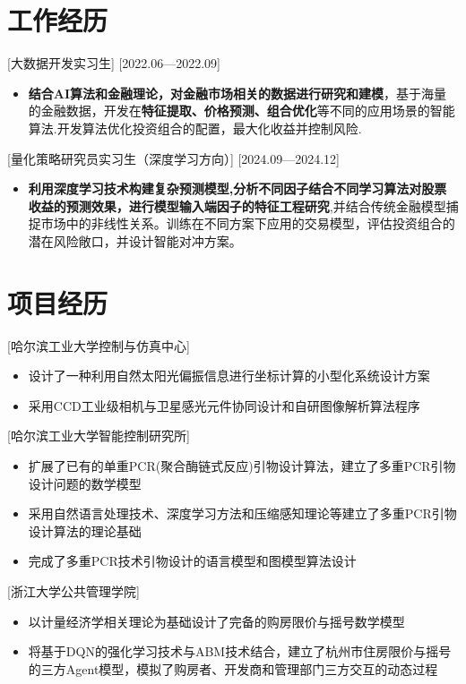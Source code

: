 \documentclass{resume}
\begin{document}
\section{\textbf{工作经历}}

[大数据开发实习生]
[2022.06—2022.09] 

\begin{itemize}
  \item \textbf{结合AI算法和金融理论，对金融市场相关的数据进行研究和建模}，基于海量的金融数据，开发在\textbf{特征提取、价格预测、组合优化}等不同的应用场景的智能算法.开发算法优化投资组合的配置，最大化收益并控制风险.
\end{itemize}
[量化策略研究员实习生（深度学习方向）]
[2024.09—2024.12] 

\begin{itemize}
  \item \textbf{利用深度学习技术构建复杂预测模型,分析不同因子结合不同学习算法对股票收益的预测效果，进行模型输入端因子的特征工程研究},并结合传统金融模型捕捉市场中的非线性关系。训练在不同方案下应用的交易模型，评估投资组合的潜在风险敞口，并设计智能对冲方案。
\end{itemize}


\section{\textbf{项目经历}}
[哈尔滨工业大学控制与仿真中心]
\begin{itemize}
  \item 设计了一种利用自然太阳光偏振信息进行坐标计算的小型化系统设计方案
  \item 采用CCD工业级相机与卫星感光元件协同设计和自研图像解析算法程序
\end{itemize}

[哈尔滨工业大学智能控制研究所]
\begin{itemize}
  \item 扩展了已有的单重PCR(聚合酶链式反应)引物设计算法，建立了多重PCR引物设计问题的数学模型
  \item 采用自然语言处理技术、深度学习方法和压缩感知理论等建立了多重PCR引物设计算法的理论基础
  \item 完成了多重PCR技术引物设计的语言模型和图模型算法设计
\end{itemize}

[浙江大学公共管理学院]
\begin{itemize}
 \item 以计量经济学相关理论为基础设计了完备的购房限价与摇号数学模型
 \item 将基于DQN的强化学习技术与ABM技术结合，建立了杭州市住房限价与摇号的三方Agent模型，模拟了购房者、开发商和管理部门三方交互的动态过程

\end{itemize}
\end{document}

